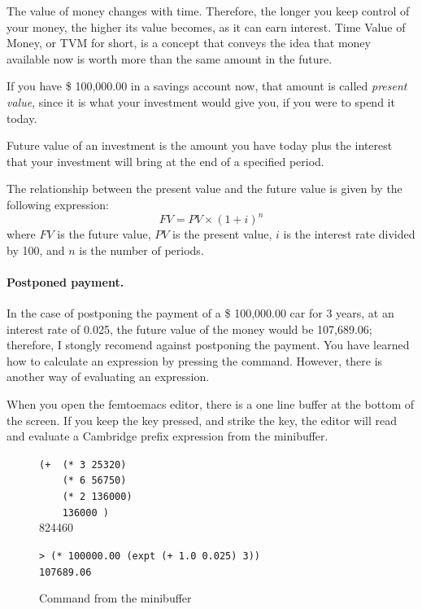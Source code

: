 \documentclass[a4paper,12pt]{book}
\newenvironment{fmpage}[1]
               {\begin{lrbox}{\fmbox}\begin{minipage}{#1}}
               {\end{minipage}\end{lrbox}\fbox{\usebox{\fmbox}}}
\begin{document}
The value of money changes with time. Therefore,
the longer you keep control of your money,
the higher its value becomes, as it can earn
interest. Time Value of Money, or TVM for short,
is a concept that conveys the idea that money
available now is worth more than the same
amount in the future.

If you have \$ 100,000.00 in a savings account
now, that amount is called {\em present value},
since it is what your investment would give you,
if you were to spend it today.

Future value of an investment is the amount
you have today plus the interest that your
investment will bring at the end of a
specified period.

The relationship between the present value
and the future value is given by the
following expression:
\begin{equation}
  FV= PV\times (1+i)^n
  \label{eq:future-value}
\end{equation}
where $FV$ is the future value, $PV$ is the present
value, $i$ is the interest rate divided by 100,
and $n$ is the number of periods.

\paragraph{Postponed payment.}
In the case of postponing the payment of a \$ 100,000.00 car
for 3 years, at an interest rate of 0.025, the future
value of the money would be 107,689.06; therefore,
I stongly recomend against postponing the payment.
You have learned how to calculate an expression
by pressing the \keys{~]~} command.
However, there is another way of evaluating an expression.

When you open the femtoemacs editor, there is
a one line buffer at the bottom of the screen.
If you keep the  key pressed,
and strike the   key, the editor
will read and evaluate a Cambridge prefix
expression from the minibuffer.

\begin{figure}[!h]
\begin{fmpage}{0.8\textwidth}

\verb|(+  (* 3 25320)|\\
\verb|    (* 6 56750)|\\
\verb|    (* 2 136000)|\\
\verb|    136000 )|\keys{~]~}\\ 
824460
\end{fmpage}

\begin{fmpage}{0.8\textwidth}
  \verb|> (* 100000.00 (expt (+ 1.0 0.025) 3))|\\
  \verb|107689.06|
\end{fmpage}
\caption{Command from the minibuffer}
\label{future-value}
\end{figure}
\end{document}
